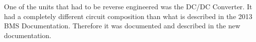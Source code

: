 One of the units that had to be reverse engineered was the DC/DC Converter. It had a completely different circuit composition than what is described in the 2013 BMS Documentation\cite{BMSDocumentation}. Therefore it was documented and described in the new documentation\cite{AU2}. 


